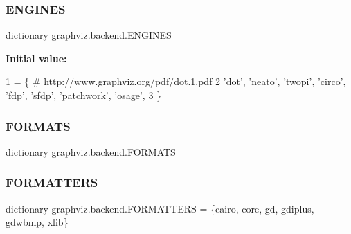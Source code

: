 \mbox{\label{namespacegraphviz_1_1backend_a84a2f16c27cdea0584e49dff5c211c71}} 
\subsubsection{\texorpdfstring{E\+N\+G\+I\+N\+ES}{ENGINES}}
{\footnotesize\ttfamily dictionary graphviz.\+backend.\+E\+N\+G\+I\+N\+ES}

{\bfseries Initial value\+:}
\begin{DoxyCode}
1 =  \{  \textcolor{comment}{# http://www.graphviz.org/pdf/dot.1.pdf}
2     \textcolor{stringliteral}{'dot'}, \textcolor{stringliteral}{'neato'}, \textcolor{stringliteral}{'twopi'}, \textcolor{stringliteral}{'circo'}, \textcolor{stringliteral}{'fdp'}, \textcolor{stringliteral}{'sfdp'}, \textcolor{stringliteral}{'patchwork'}, \textcolor{stringliteral}{'osage'},
3 \}
\end{DoxyCode}
\mbox{\label{namespacegraphviz_1_1backend_aeb48a9f6c54ada7a24d4e3e072fcf124}} 
\subsubsection{\texorpdfstring{F\+O\+R\+M\+A\+TS}{FORMATS}}
{\footnotesize\ttfamily dictionary graphviz.\+backend.\+F\+O\+R\+M\+A\+TS}

\mbox{\label{namespacegraphviz_1_1backend_a6f09436e6e2f80c0f273a34f90058d25}} 
\subsubsection{\texorpdfstring{F\+O\+R\+M\+A\+T\+T\+E\+RS}{FORMATTERS}}
{\footnotesize\ttfamily dictionary graphviz.\+backend.\+F\+O\+R\+M\+A\+T\+T\+E\+RS = \{\textquotesingle{}cairo\textquotesingle{}, \textquotesingle{}core\textquotesingle{}, \textquotesingle{}gd\textquotesingle{}, \textquotesingle{}gdiplus\textquotesingle{}, \textquotesingle{}gdwbmp\textquotesingle{}, \textquotesingle{}xlib\textquotesingle{}\}}

